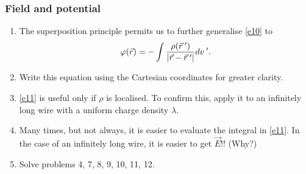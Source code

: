 \documentclass{beamer}
\begin{document}
\begin{frame}
\frametitle{Field and potential}
\begin{enumerate}
\item The superposition principle permits us to further generalise \eqref{e10} to
\begin{equation}\label{e11}
\varphi(\vec{r}) = -\int\frac{\rho(\vec{r}^{\;\prime})}{|\vec{r} - \vec{r}^{\;\prime}|}dv^{\;\prime}.
\end{equation}
\item Write this equation using the Cartesian coordinates for greater clarity.
\item \eqref{e11} is useful only if $\rho$ is localised. To confirm this, apply it
to an infinitely long wire with a uniform charge density $\lambda$.
\item Many times, but not always, it is easier to evaluate the integral in \eqref{e11}.
In the case of an infinitely long wire, it is easier to get $\vec{E}$!! (Why?)
\item Solve problems 4, 7, 8, 9, 10, 11, 12.
\end{enumerate}
\end{frame}
\end{document}
